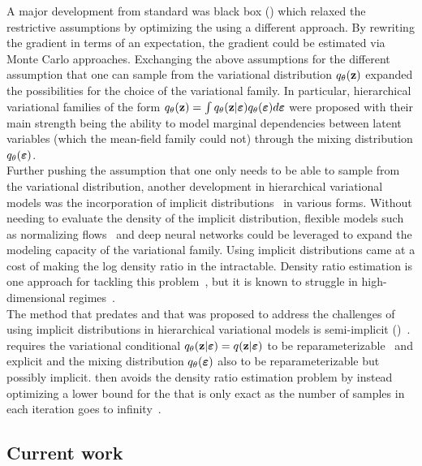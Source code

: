 \documentclass[10pt]{article}
\begin{document}
A major development from standard \vi was black box \vi (\bbvi) \citep{Ranganath:2014} which relaxed the restrictive assumptions by optimizing the \elbo using a different approach. By rewriting the \elbo gradient in terms of an expectation, the gradient could be estimated via Monte Carlo approaches. Exchanging the above assumptions for the different assumption that one can sample from the variational distribution $q_\theta(\mathbf{z})$ expanded the possibilities for the choice of the variational family. In particular, hierarchical variational families \citep{Ranganath:2016} of the form $q_\theta(\mathbf{z}) = \int q_\theta(\mathbf{z}|\bm{\varepsilon})q_\theta(\bm{\varepsilon})d\bm{\varepsilon}$ were proposed with their main strength being the ability to model marginal dependencies between latent variables (which the mean-field family could not) through the mixing distribution $q_\theta(\bm{\varepsilon})$.
\\

Further pushing the assumption that one only needs to be able to sample from the variational distribution, another development in hierarchical variational models was the incorporation of implicit distributions~\citep{Mohamed:2016} in various forms. Without needing to evaluate the density of the implicit distribution, flexible models such as normalizing flows~\citep{Rezende:2015} and deep neural networks could be leveraged to expand the modeling capacity of the variational family. Using implicit distributions came at a cost of making the log density ratio in the \elbo intractable. Density ratio estimation is one approach for tackling this problem~\citep[e.g.,][]{Mohamed:2016,Huszar:2017}, but it is known to struggle in high-dimensional regimes~\citep{Sugiyama:2012}.
\\

The method that predates \uivi and that was proposed to address the challenges of using implicit distributions in hierarchical variational models is semi-implicit \vi (\sivi)~\citep{Yin:2018}. \sivi requires the variational conditional $q_\theta(\mathbf{z}|\bm{\varepsilon})=q(\mathbf{z}|\bm{\varepsilon})$ to be reparameterizable~\citep{Kingma:2013} and explicit and the mixing distribution $q_\theta(\bm{\varepsilon})$ also to be reparameterizable but possibly implicit. \sivi then avoids the density ratio estimation problem by instead optimizing a lower bound for the \elbo that is only exact as the number of samples in each iteration goes to infinity~\citep{Yin:2018,Molchanov:2019}.


\subsection{Current work} \label{an:uivi}
\end{document}
